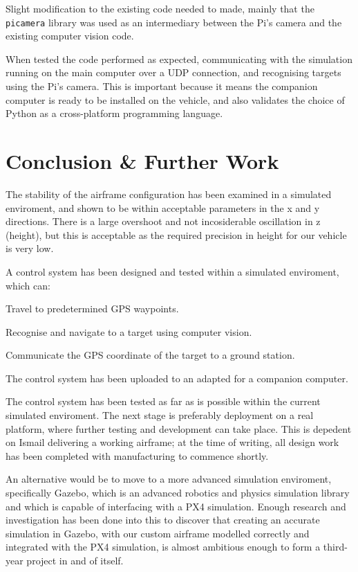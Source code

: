 \documentclass[11pt]{article}
\begin{document}
Slight modification to the existing code needed to made, mainly that the \lstinline|picamera| library was used as an intermediary between the Pi's camera and the existing computer vision code.

When tested the code performed as expected, communicating with the simulation running on the main computer over a UDP connection, and recognising targets using the Pi's camera. This is important because it means the companion computer is ready to be installed on the vehicle, and also validates the choice of Python as a cross-platform programming language.

\section{Conclusion \& Further Work}
\begin{compactenum}
    \item The stability of the airframe configuration has been examined in a simulated enviroment, and shown to be within acceptable parameters in the x and y directions. There is a large overshoot and not incosiderable oscillation in z (height), but this is acceptable as the required precision in height for our vehicle is very low.
    \item A control system has been designed and tested within a simulated enviroment, which can:
    \begin{compactenum}
        \item Travel to predetermined GPS waypoints.
        \item Recognise and navigate to a target using computer vision.
        \item Communicate the GPS coordinate of the target to a ground station.
    \end{compactenum}
    \item The control system has been uploaded to an adapted for a companion computer.
\end{compactenum}

\vspace{1em}
The control system has been tested as far as is possible within the current simulated enviroment. The next stage is preferably deployment on a real platform, where further testing and development can take place. This is depedent on Ismail delivering a working airframe; at the time of writing, all design work has been completed with manufacturing to commence shortly.\cite{Ismail_paper}

An alternative would be to move to a more advanced simulation enviroment, specifically Gazebo, which is an advanced robotics and physics simulation library and which is capable of interfacing with a PX4 simulation.\cite{PX4_dev_guide} Enough research and investigation has been done into this to discover that creating an accurate simulation in Gazebo, with our custom airframe modelled correctly and integrated with the PX4 simulation, is almost ambitious enough to form a third-year project in and of itself.
\end{document}
